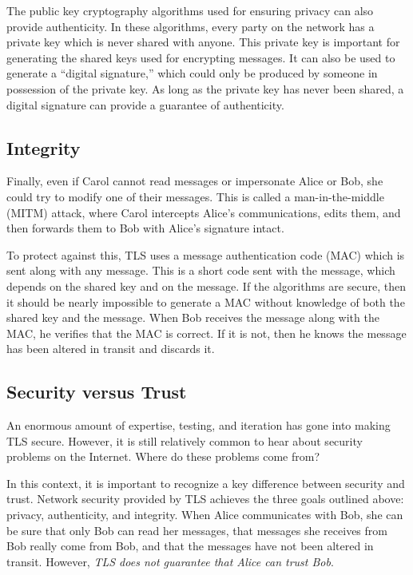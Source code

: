 The public key cryptography algorithms used for ensuring privacy can also provide authenticity. In these algorithms, every party on the network has a private key which is never shared with anyone. This private key is important for generating the shared keys used for encrypting messages. It can also be used to generate a ``digital signature,'' which could only be produced by someone in possession of the private key. As long as the private key has never been shared, a digital signature can provide a guarantee of authenticity.

\subsection{Integrity}

Finally, even if Carol cannot read messages or impersonate Alice or Bob, she could try to modify one of their messages. This is called a man-in-the-middle (MITM) attack, where Carol intercepts Alice's communications, edits them, and then forwards them to Bob with Alice's signature intact.

To protect against this, TLS uses a message authentication code (MAC) which is sent along with any message. This is a short code sent with the message, which depends on the shared key and on the message. If the algorithms are secure, then it should be nearly impossible to generate a MAC without knowledge of both the shared key and the message. When Bob receives the message along with the MAC, he verifies that the MAC is correct. If it is not, then he knows the message has been altered in transit and discards it.

\subsection{Security versus Trust}

An enormous amount of expertise, testing, and iteration has gone into making TLS secure. However, it is still relatively common to hear about security problems on the Internet. Where do these problems come from?

In this context, it is important to recognize a key difference between security and trust. Network security provided by TLS achieves the three goals outlined above: privacy, authenticity, and integrity. When Alice communicates with Bob, she can be sure that only Bob can read her messages, that messages she receives from Bob really come from Bob, and that the messages have not been altered in transit. However, \emph{TLS does not guarantee that Alice can trust Bob}.

